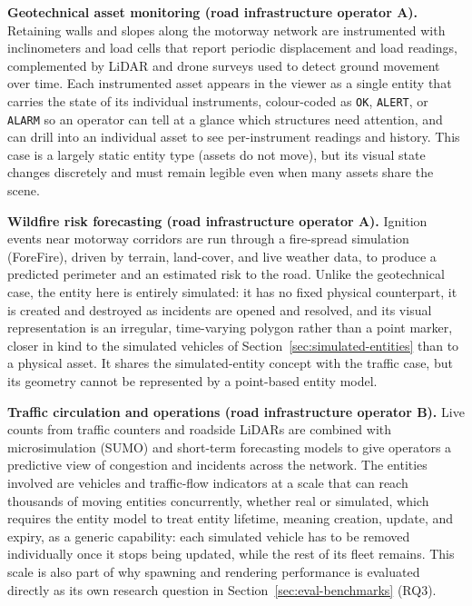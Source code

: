 \textbf{Geotechnical asset monitoring (road infrastructure operator A).} Retaining walls and slopes along the motorway network are instrumented with inclinometers and load cells that report periodic displacement and load readings, complemented by LiDAR and drone surveys used to detect ground movement over time. Each instrumented asset appears in the viewer as a single entity that carries the state of its individual instruments, colour-coded as \texttt{OK}, \texttt{ALERT}, or \texttt{ALARM} so an operator can tell at a glance which structures need attention, and can drill into an individual asset to see per-instrument readings and history. This case is a largely static entity type (assets do not move), but its visual state changes discretely and must remain legible even when many assets share the scene.

\textbf{Wildfire risk forecasting (road infrastructure operator A).} Ignition events near motorway corridors are run through a fire-spread simulation (ForeFire), driven by terrain, land-cover, and live weather data, to produce a predicted perimeter and an estimated risk to the road. Unlike the geotechnical case, the entity here is entirely simulated: it has no fixed physical counterpart, it is created and destroyed as incidents are opened and resolved, and its visual representation is an irregular, time-varying polygon rather than a point marker, closer in kind to the simulated vehicles of Section~\ref{sec:simulated-entities} than to a physical asset. It shares the simulated-entity concept with the traffic case, but its geometry cannot be represented by a point-based entity model.

\textbf{Traffic circulation and operations (road infrastructure operator B).} Live counts from traffic counters and roadside LiDARs are combined with microsimulation (SUMO) and short-term forecasting models to give operators a predictive view of congestion and incidents across the network. The entities involved are vehicles and traffic-flow indicators at a scale that can reach thousands of moving entities concurrently, whether real or simulated, which requires the entity model to treat entity lifetime, meaning creation, update, and expiry, as a generic capability: each simulated vehicle has to be removed individually once it stops being updated, while the rest of its fleet remains. This scale is also part of why spawning and rendering performance is evaluated directly as its own research question in Section~\ref{sec:eval-benchmarks} (RQ3).

